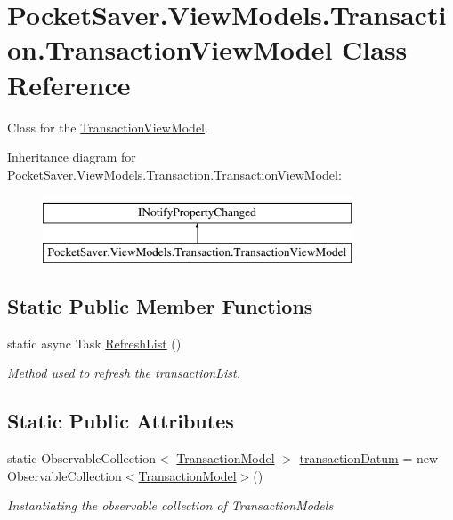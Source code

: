 \hypertarget{class_pocket_saver_1_1_view_models_1_1_transaction_1_1_transaction_view_model}{}\section{Pocket\+Saver.\+View\+Models.\+Transaction.\+Transaction\+View\+Model Class Reference}
\label{class_pocket_saver_1_1_view_models_1_1_transaction_1_1_transaction_view_model}


Class for the \hyperlink{class_pocket_saver_1_1_view_models_1_1_transaction_1_1_transaction_view_model}{Transaction\+View\+Model}.  


Inheritance diagram for Pocket\+Saver.\+View\+Models.\+Transaction.\+Transaction\+View\+Model\+:\begin{figure}[H]
\begin{center}
\leavevmode
\includegraphics[height=2.000000cm]{class_pocket_saver_1_1_view_models_1_1_transaction_1_1_transaction_view_model}
\end{center}
\end{figure}
\subsection*{Static Public Member Functions}
\begin{DoxyCompactItemize}
\item 
static async Task \hyperlink{class_pocket_saver_1_1_view_models_1_1_transaction_1_1_transaction_view_model_a18c3f058a5098c06cb7784ea7e5c8537}{Refresh\+List} ()
\begin{DoxyCompactList}\small\item\em Method used to refresh the transaction\+List. \end{DoxyCompactList}\end{DoxyCompactItemize}
\subsection*{Static Public Attributes}
\begin{DoxyCompactItemize}
\item 
static Observable\+Collection$<$ \hyperlink{class_pocket_saver_1_1_models_1_1_transaction_model}{Transaction\+Model} $>$ \hyperlink{class_pocket_saver_1_1_view_models_1_1_transaction_1_1_transaction_view_model_a5e19ca45b1a5803cbb1ab7b506ca9820}{transaction\+Datum} = new Observable\+Collection$<$\hyperlink{class_pocket_saver_1_1_models_1_1_transaction_model}{Transaction\+Model}$>$()
\begin{DoxyCompactList}\small\item\em Instantiating the observable collection of Transaction\+Models \end{DoxyCompactList}\end{DoxyCompactItemize}
